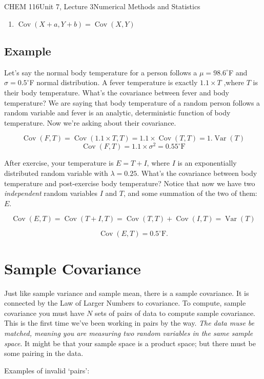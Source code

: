 \documentclass{article}
\DeclareMathOperator{\Var}{Var}
\DeclareMathOperator{\Cov}{Cov}
\begin{document}
\begin{tdoc}{CHEM 116}{Unit 7, Lecture 3}{Numerical Methods and Statistics}
\begin{enumerate}
\item $\Cov(X + a, Y + b) = \Cov(X,Y)$\\

\end{enumerate}

\subsection{Example}

Let's say the normal body temperature for a person follows a $\mu = 98.6 ^{\circ}$F and $\sigma=0.5 ^{\circ}$F normal distribution. A fever temperature is exactly $1.1\times T$ ,where $T$ is their body temperature. What's the covariance between fever and body temperature? We are saying that body temperature of a random person follows a random variable and fever is an analytic, deterministic function of body temperature. Now we're asking about their covariance.

\[
\Cov(F, T) = \Cov(1.1\times T, T) = 1.1\times \Cov(T, T) = 1. \Var(T)
\]
\[
\Cov(F,T) = 1.1\times \sigma^2 = 0.55^\circ \textrm{F}
\]

After exercise, your temperature is $E = T + I$, where $I$ is an
exponentially distributed random variable with $\lambda =0.25$. What's the covariance between body temperature and post-exercise body temperature? Notice that now we have two \textit{independent} random variables $I$ and $T$, and some summation of the two of them: $E$.

\[
\Cov(E, T) = \Cov(T + I, T) = \Cov(T, T) + \Cov(I, T) = \Var(T)
\]

\[
\Cov(E, T) = 0.5^\circ \textrm{F}.
\]

\section{Sample Covariance}

Just like sample variance and sample mean, there is a sample
covariance. It is connected by the Law of Larger Numbers to covariance. To compute, sample covariance you must have $N$ sets of pairs of data to compute sample
covariance. This is the first time we've been working in pairs by the
way. \textit{The data muse be matched, meaning you are measuring two random
variables in the same sample space}. It might be that your sample space
is a product space; but there must be some pairing in the data.

Examples of invalid `pairs':

\begin{enumerate}


\end{enumerate}
\end{tdoc}
\end{document}
